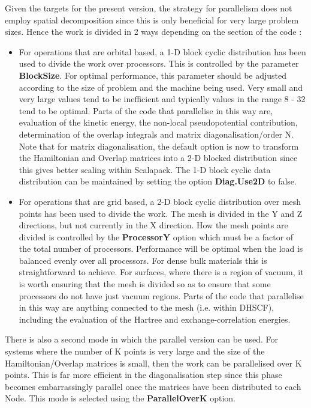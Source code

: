\documentclass[11pt]{article}
\begin{document}
Given the targets for the present version, the strategy for parallelism
does not employ spatial decomposition since this is only beneficial for
very large problem sizes. Hence the work is divided in 2 ways depending
on the section of the code :

\begin{itemize}
\item
For operations that are orbital based, a 1-D block cyclic distribution
has been used to divide the work over processors. This is controlled
by the parameter {\bf BlockSize}.
For optimal performance, this parameter
should be adjusted according to the size of problem and the machine
being used. Very small and very large values tend to be inefficient
and typically values in the range 8 - 32 tend to be optimal. Parts of
the code that parallelise in this way are, evaluation of the kinetic
energy, the non-local pseudopotential contribution, determination of
the overlap integrals and matrix diagonalisation/order N. Note that 
for matrix diagonalisation, the default option is now to transform the
Hamiltonian and Overlap matrices into a 2-D blocked distribution since
this gives better scaling within Scalapack. The 1-D block cyclic
data distribution can be maintained by setting the option {\bf Diag.Use2D}
to false.

\item
For operations that are grid based, a 2-D block cyclic distribution
over mesh points has been used to divide the work. The mesh is divided
in the Y and Z directions, but not currently in the X direction. How
the mesh points are divided is controlled by the {\bf ProcessorY}
option which must be a factor of the total number of processors.
Performance will be optimal when the load is balanced evenly
over all processors. For dense bulk materials this is straightforward
to achieve. For surfaces, where there is a region of vacuum, it is
worth ensuring that the mesh is divided so as to ensure that some
processors do not have just vacuum regions. Parts of the code that
parallelise in this way are anything connected to the mesh (i.e. within
DHSCF), including the evaluation of the Hartree and exchange-correlation
energies.
\end{itemize}

There is also a second mode in which the parallel version can be used. For
systems where the number of K points is very large and the size of the
Hamiltonian/Overlap matrices is small, then the work can be parallelised
over K points. This is far more efficient in the diagonalisation step
since this phase becomes embarrassingly parallel once the matrices have
been distributed to each Node. This mode is selected using the 
{\bf ParallelOverK} 
option.
\end{document}
